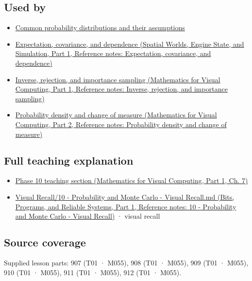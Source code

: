 \subsection{Used by}\label{appendix-4d0203f7944f-used-by}

\hypertarget{appendix-4d0203f7944f-used-by}{}

\begin{itemize}
\tightlist
\item
  \hyperref[appendix-a2360b435383]{Common probability distributions and their assumptions}
\item
  \href{../05-Spatial-Worlds-Engine-State-and-Simulation-P01/main.pdf\#nameddest=appendix-54c383df9992}{Expectation, covariance, and dependence (Spatial Worlds, Engine State, and Simulation, Part 1, Reference notes: Expectation, covariance, and dependence)}
\item
  \href{../02-Mathematics-for-Visual-Computing-P01/main.pdf\#nameddest=appendix-8d863ed954d0}{Inverse, rejection, and importance sampling (Mathematics for Visual Computing, Part 1, Reference notes: Inverse, rejection, and importance sampling)}
\item
  \href{../02-Mathematics-for-Visual-Computing-P02/main.pdf\#nameddest=appendix-4815cd87ab8b}{Probability density and change of measure (Mathematics for Visual Computing, Part 2, Reference notes: Probability density and change of measure)}
\end{itemize}

\subsection{Full teaching explanation}\label{appendix-4d0203f7944f-full-teaching-explanation}

\hypertarget{appendix-4d0203f7944f-full-teaching-explanation}{}

\begin{itemize}
\tightlist
\item
  \href{../02-Mathematics-for-Visual-Computing-P01/main.pdf\#nameddest=02-foundations-ii-ch023-random-quantities-and-their-probability-laws}{Phase 10 teaching section (Mathematics for Visual Computing, Part 1, Ch. 7)}
\item
  \href{../01-Bits-Programs-and-Reliable-Systems-P01/main.pdf\#nameddest=appendix-cb5af353ef77}{Visual Recall/10 - Probability and Monte Carlo - Visual Recall.md (Bits, Programs, and Reliable Systems, Part 1, Reference notes: 10 - Probability and Monte Carlo - Visual Recall)} · visual recall
\end{itemize}

\subsection{Source coverage}\label{appendix-4d0203f7944f-source-coverage}

\hypertarget{appendix-4d0203f7944f-source-coverage}{}

Supplied lesson parts: 907 (T01 · M055), 908 (T01 · M055), 909 (T01 · M055), 910 (T01 · M055), 911 (T01 · M055), 912 (T01 · M055).
